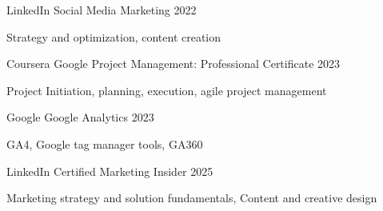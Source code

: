 
\begin{cventries}

\cventry
{LinkedIn} %
{Social Media Marketing} 
{} %
{2022} %
{
\begin{cvitems} %
\item Strategy and optimization, content creation
\end{cvitems}
}

\cventry
{Coursera} 
{Google Project Management: Professional Certificate} %
{} %
{2023} %
{
\begin{cvitems} %
\item Project Initiation, planning, execution, agile project management
\end{cvitems}
}

\cventry
{Google} 
{Google Analytics} %
{} %
{2023} %
{
\begin{cvitems} %
\item GA4, Google tag manager tools, GA360
\end{cvitems}
}

\cventry
{LinkedIn} %
{Certified Marketing Insider} 
{} %
{2025} %
{
\begin{cvitems} %
\item Marketing strategy and solution fundamentals, Content and creative design
\end{cvitems}
}




\end{cventries}